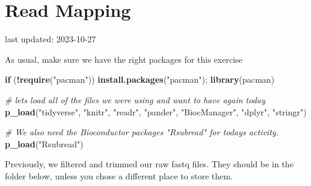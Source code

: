 \documentclass[
]{book}
\newenvironment{Shaded}{\begin{snugshade}}{\end{snugshade}}
\newcommand{\AttributeTok}[1]{\textcolor[rgb]{0.13,0.29,0.53}{#1}}
\newcommand{\CommentTok}[1]{\textcolor[rgb]{0.56,0.35,0.01}{\textit{#1}}}
\newcommand{\ConstantTok}[1]{\textcolor[rgb]{0.56,0.35,0.01}{#1}}
\newcommand{\ControlFlowTok}[1]{\textcolor[rgb]{0.13,0.29,0.53}{\textbf{#1}}}
\newcommand{\FunctionTok}[1]{\textcolor[rgb]{0.13,0.29,0.53}{\textbf{#1}}}
\newcommand{\NormalTok}[1]{#1}
\newcommand{\OtherTok}[1]{\textcolor[rgb]{0.56,0.35,0.01}{#1}}
\newcommand{\SpecialCharTok}[1]{\textcolor[rgb]{0.81,0.36,0.00}{\textbf{#1}}}
\newcommand{\StringTok}[1]{\textcolor[rgb]{0.31,0.60,0.02}{#1}}
\begin{document}
\hypertarget{read-mapping}{%
\chapter{Read Mapping}\label{read-mapping}}

last updated: 2023-10-27

As usual, make sure we have the right packages for this exercise

\begin{Shaded}
\begin{Highlighting}[]
\ControlFlowTok{if}\NormalTok{ (}\SpecialCharTok{!}\FunctionTok{require}\NormalTok{(}\StringTok{"pacman"}\NormalTok{)) }\FunctionTok{install.packages}\NormalTok{(}\StringTok{"pacman"}\NormalTok{); }\FunctionTok{library}\NormalTok{(pacman)}

\CommentTok{\# let\textquotesingle{}s load all of the files we were using and want to have again today}
\FunctionTok{p\_load}\NormalTok{(}\StringTok{"tidyverse"}\NormalTok{, }\StringTok{"knitr"}\NormalTok{, }\StringTok{"readr"}\NormalTok{,}
       \StringTok{"pander"}\NormalTok{, }\StringTok{"BiocManager"}\NormalTok{, }
       \StringTok{"dplyr"}\NormalTok{, }\StringTok{"stringr"}\NormalTok{)}

\CommentTok{\# We also need the Bioconductor packages "Rsubread" for today\textquotesingle{}s activity.}
\FunctionTok{p\_load}\NormalTok{(}\StringTok{"Rsubread"}\NormalTok{)}
\end{Highlighting}
\end{Shaded}

Previously, we filtered and trimmed our raw fastq files. They should be in the folder below, unless you chose a different place to store them.

\begin{Shaded}
\end{Shaded}
\end{document}
